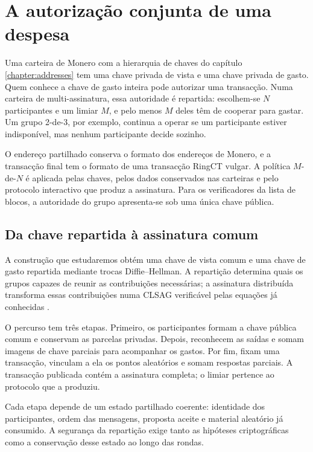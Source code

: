 \chapter{A autorização conjunta de uma despesa}
\label{chapter:multisignatures}

Uma carteira de Monero com a hierarquia de chaves do capítulo
\ref{chapter:addresses} tem uma chave privada de vista e uma chave privada
de gasto. Quem conhece a chave de gasto inteira pode autorizar uma
transacção. Numa carteira de multi-assinatura, essa autoridade é repartida:
escolhem-se \(N\) participantes e um limiar \(M\), e pelo menos \(M\) deles
têm de cooperar para gastar. Um grupo 2-de-3, por exemplo, continua a operar
se um participante estiver indisponível, mas nenhum participante decide
sozinho.

O endereço partilhado conserva o formato dos endereços de Monero, e a
transacção final tem o formato de uma transacção RingCT vulgar. A política
\(M\)-de-\(N\) é aplicada pelas chaves, pelos dados conservados nas carteiras e
pelo protocolo interactivo que
produz a assinatura. Para os verificadores da lista de blocos, a autoridade
do grupo apresenta-se sob uma única chave pública.

\section{Da chave repartida à assinatura comum}
\label{sec:multisig-implementation-status}

A construção que estudaremos obtém uma chave de vista comum e uma chave de
gasto repartida mediante trocas Diffie--Hellman. A repartição determina quais
os grupos capazes de reunir as contribuições necessárias; a assinatura
distribuída transforma essas contribuições numa CLSAG verificável pelas
equações já conhecidas \cite{MRL-0009-multisig,monero-source-v16}.

O percurso tem três etapas. Primeiro, os participantes formam a chave
pública comum e conservam as parcelas privadas. Depois, reconhecem as saídas
e somam imagens de chave parciais para acompanhar os gastos. Por fim,
fixam uma transacção, vinculam a ela os pontos aleatórios e somam respostas
parciais. A transacção publicada contém a assinatura completa; o limiar
pertence ao protocolo que a produziu.

Cada etapa depende de um estado partilhado coerente: identidade dos
participantes, ordem das mensagens, proposta aceite e material aleatório já
consumido. A segurança da repartição exige tanto as hipóteses criptográficas
como a conservação desse estado ao longo das rondas.

